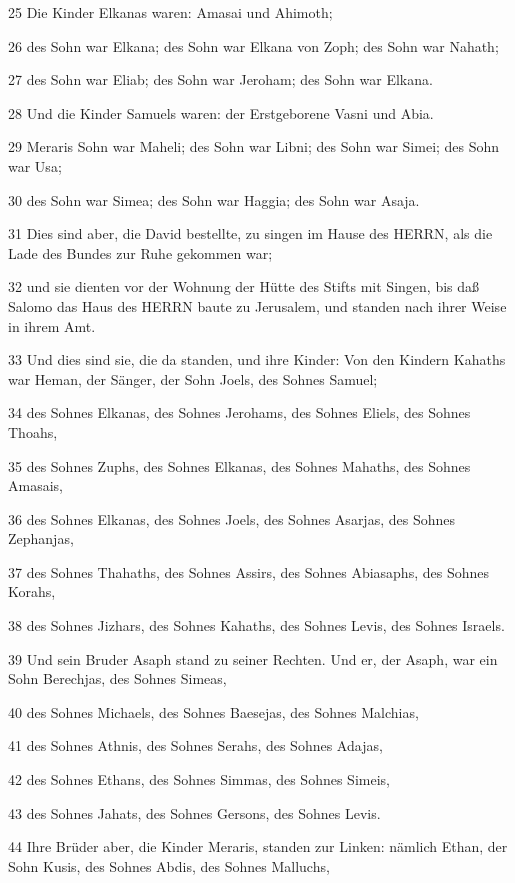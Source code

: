 \par 25 Die Kinder Elkanas waren: Amasai und Ahimoth;
\par 26 des Sohn war Elkana; des Sohn war Elkana von Zoph; des Sohn war Nahath;
\par 27 des Sohn war Eliab; des Sohn war Jeroham; des Sohn war Elkana.
\par 28 Und die Kinder Samuels waren: der Erstgeborene Vasni und Abia.
\par 29 Meraris Sohn war Maheli; des Sohn war Libni; des Sohn war Simei; des Sohn war Usa;
\par 30 des Sohn war Simea; des Sohn war Haggia; des Sohn war Asaja.
\par 31 Dies sind aber, die David bestellte, zu singen im Hause des HERRN, als die Lade des Bundes zur Ruhe gekommen war;
\par 32 und sie dienten vor der Wohnung der Hütte des Stifts mit Singen, bis daß Salomo das Haus des HERRN baute zu Jerusalem, und standen nach ihrer Weise in ihrem Amt.
\par 33 Und dies sind sie, die da standen, und ihre Kinder: Von den Kindern Kahaths war Heman, der Sänger, der Sohn Joels, des Sohnes Samuel;
\par 34 des Sohnes Elkanas, des Sohnes Jerohams, des Sohnes Eliels, des Sohnes Thoahs,
\par 35 des Sohnes Zuphs, des Sohnes Elkanas, des Sohnes Mahaths, des Sohnes Amasais,
\par 36 des Sohnes Elkanas, des Sohnes Joels, des Sohnes Asarjas, des Sohnes Zephanjas,
\par 37 des Sohnes Thahaths, des Sohnes Assirs, des Sohnes Abiasaphs, des Sohnes Korahs,
\par 38 des Sohnes Jizhars, des Sohnes Kahaths, des Sohnes Levis, des Sohnes Israels.
\par 39 Und sein Bruder Asaph stand zu seiner Rechten. Und er, der Asaph, war ein Sohn Berechjas, des Sohnes Simeas,
\par 40 des Sohnes Michaels, des Sohnes Baesejas, des Sohnes Malchias,
\par 41 des Sohnes Athnis, des Sohnes Serahs, des Sohnes Adajas,
\par 42 des Sohnes Ethans, des Sohnes Simmas, des Sohnes Simeis,
\par 43 des Sohnes Jahats, des Sohnes Gersons, des Sohnes Levis.
\par 44 Ihre Brüder aber, die Kinder Meraris, standen zur Linken: nämlich Ethan, der Sohn Kusis, des Sohnes Abdis, des Sohnes Malluchs,
